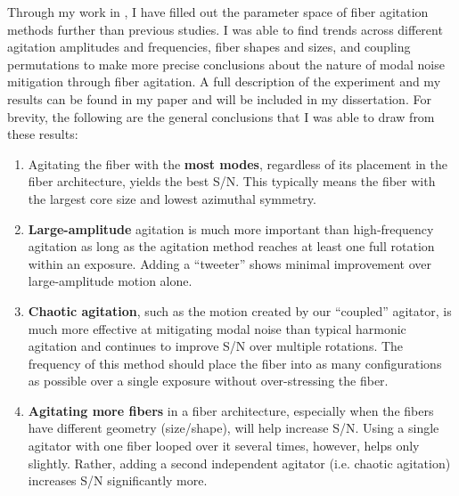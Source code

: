 \documentclass[11pt]{article}
\begin{document}
Through my work in \citet{Petersburg2018}, I have filled out the parameter space of fiber agitation methods further than previous studies. I was able to find trends across different agitation amplitudes and frequencies, fiber shapes and sizes, and coupling permutations to make more precise conclusions about the nature of modal noise mitigation through fiber agitation. A full description of the experiment and my results can be found in my paper and will be included in my dissertation. For brevity, the following are the general conclusions that I was able to draw from these results:
\begin{enumerate}
\item Agitating the fiber with the \textbf{most modes}, regardless of its placement in the fiber architecture, yields the best S/N. This typically means the fiber with the largest core size and lowest azimuthal symmetry.
\item \textbf{Large-amplitude} agitation is much more important than high-frequency agitation as long as the agitation method reaches at least one full rotation within an exposure. Adding a ``tweeter'' shows minimal improvement over large-amplitude motion alone.
\item \textbf{Chaotic agitation}, such as the motion created by our ``coupled'' agitator, is much more effective at mitigating modal noise than typical harmonic agitation and continues to improve S/N over multiple rotations. The frequency of this method should place the fiber into as many configurations as possible over a single exposure without over-stressing the fiber.
\item \textbf{Agitating more fibers} in a fiber architecture, especially when the fibers have different geometry (size/shape), will help increase S/N. Using a single agitator with one fiber looped over it several times, however, helps only slightly. Rather, adding a second independent agitator (i.e. chaotic agitation) increases S/N significantly more.
\end{enumerate}
\end{document}
